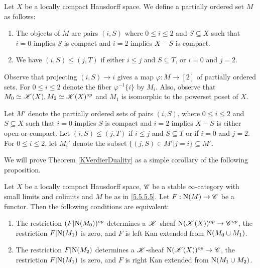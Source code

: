 \documentclass[../../thesis.tex]{subfiles}
\begin{document}
\begin{definition}[{\cite[Notation 5.5.5.5]{HA}}]\label{5.5.5.5}
    Let $X$ be a locally compact Hausdorff space.
    We define a partially ordered set $M$ as follows:
    \begin{enumerate}
        \item The objects of $M$ are pairs $(i,S)$ where $0 \leq i \leq 2$ and $S \subseteq X$ such that $i=0$ implies $S$ is compact and $i=2$ implies $X-S$ is compact.
        \item We have $(i,S) \leq (j,T)$ if either $i\leq j$ and $S\subseteq T$, or $i=0$ and $j=2$.
    \end{enumerate}
\end{definition}
\begin{remark}[{\cite[Remark 5.5.5.6]{HA}}]
    Observe that projecting $(i,S) \to i$ gives a map $\varphi: M \to [2]$ of partially ordered sets.
    For $0 \leq i \leq 2$ denote the fiber $\varphi^{-1}\{i\}$ by $M_i$.
    Also, observe that $M_0 \simeq \mathscr{K}(X), M_2\simeq \mathscr{K}(X)^{op}$ and $M_1$ is isomorphic to the powerset poset of $X$.
\end{remark}
\begin{definition}
    Let $M'$ denote the partially ordered sets of pairs $(i,S)$, where $0 \leq i \leq 2$ and $S \subseteq X$ such that $i=0$ implies $S$ is compact and $i=2$ implies $X-S$ is either open or compact.
    Let $(i, S) \leq (j,T)$ if $i\leq j$ and $S\subseteq T$ or if $i=0$ and $j=2$.
    For $0 \leq i \leq 2$, let $M_i'$ denote the subset $\{(j,S) \in M' | j=i\} \subseteq M'$.
\end{definition}
We will prove Theorem \ref{KVerdierDuality} as a simple corollary of the following proposition.
\begin{proposition}[{\cite[Proposition 5.5.5.7]{HA}}]\label{5.5.5.7}
    Let $X$ be a locally compact Hausdorff space, $\mathscr{C}$ be a stable $\infty$-category with small limits and colimits and $M$ be as in \ref{5.5.5.5}.
    Let $F : \mathrm{N}(M) \to \mathscr{C}$ be a functor.
    Then the following conditions are equivalent:
    \begin{enumerate}
        \item The restriction $(F|\mathrm{N}(M_0))^{op}$ determines a $\mathscr{K}$-sheaf $\mathrm{N}(\mathscr{K}(X))^{op} \to \mathscr{C}^{op}$, the restriction $F|\mathrm{N}(M_1)$ is zero, and $F$ is left Kan extended from $\mathrm{N}(M_0 \cup M_1)$.
        \item The restriction $F|\mathrm{N}(M_2)$ determines a $\mathscr{K}$-sheaf $\mathrm{N}(\mathscr{K}(X))^{op} \to \mathscr{C}$, the restriction $F|\mathrm{N}(M_1)$ is zero, and $F$ is right Kan extended from $\mathrm{N}(M_1 \cup M_2)$.
    \end{enumerate}
\end{proposition}
\end{document}
